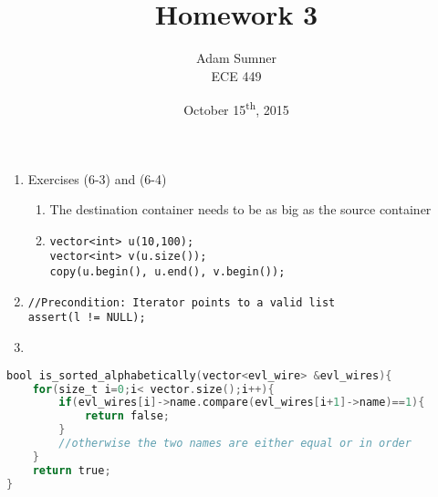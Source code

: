 \documentclass[12pt]{article}
\title{\textbf{Homework 3}}
\author{Adam Sumner \\ ECE 449}
\date{October 15\textsuperscript{th}, 2015}
\begin{document}
\maketitle

\begin{enumerate}
	\item Exercises (6-3) and (6-4)
	\begin{enumerate}
		\item The destination container needs to be as big as the source container
		\item 
		\texttt{vector<int> u(10,100);}\\
		\texttt{vector<int> v(u.size());}\\
		\texttt{copy(u.begin(), u.end(), v.begin());}
	\end{enumerate}
	\item \texttt{//Precondition: Iterator points to a valid list}\\
			\texttt{assert(l != NULL);}
	\item 
	
\end{enumerate}
\begin{lstlisting}[language=C,basicstyle=\footnotesize]
bool is_sorted_alphabetically(vector<evl_wire> &evl_wires){
	for(size_t i=0;i< vector.size();i++){
		if(evl_wires[i]->name.compare(evl_wires[i+1]->name)==1){
			return false; 
		}
		//otherwise the two names are either equal or in order
	}
	return true;
}
\end{lstlisting}
\end{document}
